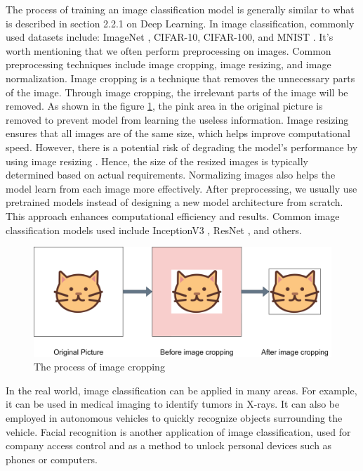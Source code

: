 \begin{ZhChapter}
    The process of training an image classification model is generally similar to what is described in section 2.2.1 on Deep Learning. In image classification, commonly used datasets include: ImageNet \cite{5206848}, CIFAR-10, CIFAR-100, and MNIST \cite{deng2012mnist}. It's worth mentioning that we often perform preprocessing on images. Common preprocessing techniques include image cropping, image resizing, and image normalization. Image cropping is a technique that removes the unnecessary parts of the image. Through image cropping, the irrelevant parts of the image will be removed. As shown in the figure \ref{fig: imageCropping}, the pink area in the original picture is removed to prevent model from learning the useless information. Image resizing ensures that all images are of the same size, which helps improve computational speed. However, there is a potential risk of degrading the model's performance by using image resizing \cite{relationshipBetweenImageSizeAndQuality}. Hence, the size of the resized images is typically determined based on actual requirements. Normalizing images also helps the model learn from each image more effectively. After preprocessing, we usually use pretrained models instead of designing a new model architecture from scratch. This approach enhances computational efficiency and results. Common image classification models used include InceptionV3 \cite{szegedy2015rethinkinginceptionarchitecturecomputer}, ResNet \cite{he2015deepresiduallearningimage}, and others.
    \begin{figure}[htbp]
        \centering
        \includegraphics[width = 1\textwidth]{image/ImageCropping.png}
        \caption{The process of image cropping}
        \label{fig: imageCropping}
    \end{figure}

    In the real world, image classification can be applied in many areas. For example, it can be used in medical imaging to identify tumors in X-rays. It can also be employed in autonomous vehicles to quickly recognize objects surrounding the vehicle. Facial recognition is another application of image classification, used for company access control and as a method to unlock personal devices such as phones or computers.


\end{ZhChapter}
